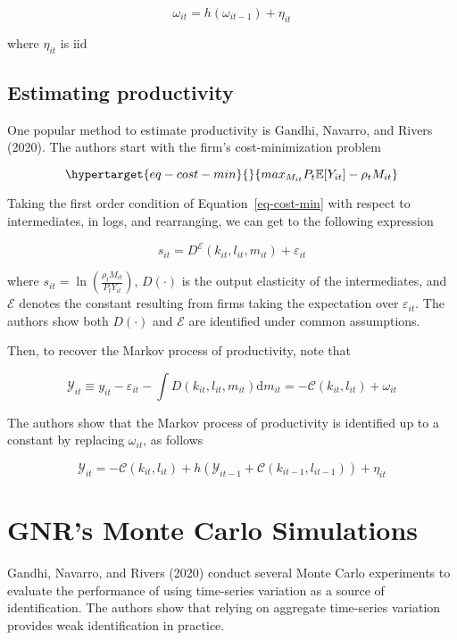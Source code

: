 \documentclass[
]{article}
\begin{document}
\[
\omega_{it}=h(\omega_{it-1})+\eta_{it}
\]

where \(\eta_{it}\) is iid

\hypertarget{estimating-productivity}{%
\subsection{Estimating productivity}\label{estimating-productivity}}

One popular method to estimate productivity is Gandhi, Navarro, and
Rivers (2020). The authors start with the firm's cost-minimization
problem

\begin{equation}\protect\hypertarget{eq-cost-min}{}{
max_{M_{it}} P_{t}\mathbb{E}[Y_{it}]- \rho_{t}M_{it}
}\label{eq-cost-min}\end{equation}

Taking the first order condition of Equation~\ref{eq-cost-min} with
respect to intermediates, in logs, and rearranging, we can get to the
following expression

\[
s_{it}=D^{\mathcal{E}}(k_{it}, l_{it},m_{it})+\varepsilon_{it}
\]

where \(s_{it}=\ln(\frac{\rho_t M_{it}}{P_t Y_{it}})\), \(D(\cdot)\) is
the output elasticity of the intermediates, and \(\mathcal{E}\) denotes
the constant resulting from firms taking the expectation over
\(\varepsilon_{it}\). The authors show both \(D(\cdot)\) and
\(\mathcal{E}\) are identified under common assumptions.

Then, to recover the Markov process of productivity, note that

\[
\mathcal{Y}_{it}\equiv y_{it}-\varepsilon_{it}-\int D(k_{it}, l_{it},m_{it})\text{d}m_{it} = -\mathcal{C}(k_{it},l_{it})+\omega_{it}
\]

The authors show that the Markov process of productivity is identified
up to a constant by replacing \(\omega_{it}\), as follows

\[
\mathcal{Y}_{it}=-\mathcal{C}(k_{it},l_{it})+h(\mathcal{Y}_{it-1}+\mathcal{C}(k_{it-1},l_{it-1}))+\eta_{it}
\]

\hypertarget{gnrs-monte-carlo-simulations}{%
\section{GNR's Monte Carlo
Simulations}\label{gnrs-monte-carlo-simulations}}

Gandhi, Navarro, and Rivers (2020) conduct several Monte Carlo
experiments to evaluate the performance of using time-series variation
as a source of identification. The authors show that relying on
aggregate time-series variation provides weak identification in
practice.
\end{document}

